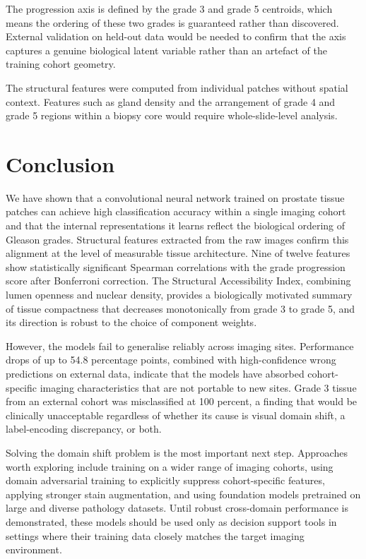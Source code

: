 \documentclass[12pt, a4paper]{article}
\begin{document}
The progression axis is defined by the grade 3 and grade 5 centroids, which means
the ordering of these two grades is guaranteed rather than discovered. External
validation on held-out data would be needed to confirm that the axis captures a
genuine biological latent variable rather than an artefact of the training cohort
geometry.

The structural features were computed from individual patches without spatial context.
Features such as gland density and the arrangement of grade 4 and grade 5 regions
within a biopsy core would require whole-slide-level analysis.

\section{Conclusion}

We have shown that a convolutional neural network trained on prostate tissue
patches can achieve high classification accuracy within a single imaging cohort
and that the internal representations it learns reflect the biological ordering
of Gleason grades. Structural features extracted from the raw images confirm this
alignment at the level of measurable tissue architecture. Nine of twelve features
show statistically significant Spearman correlations with the grade progression
score after Bonferroni correction. The Structural Accessibility Index, combining
lumen openness and nuclear density, provides a biologically motivated summary of
tissue compactness that decreases monotonically from grade 3 to grade 5, and its
direction is robust to the choice of component weights.

However, the models fail to generalise reliably across imaging sites. Performance
drops of up to 54.8 percentage points, combined with high-confidence wrong
predictions on external data, indicate that the models have absorbed cohort-specific
imaging characteristics that are not portable to new sites. Grade 3 tissue from an
external cohort was misclassified at 100 percent, a finding that would be clinically
unacceptable regardless of whether its cause is visual domain shift, a label-encoding
discrepancy, or both.

Solving the domain shift problem is the most important next step. Approaches worth
exploring include training on a wider range of imaging cohorts, using domain
adversarial training to explicitly suppress cohort-specific features, applying
stronger stain augmentation, and using foundation models pretrained on large and
diverse pathology datasets. Until robust cross-domain performance is demonstrated,
these models should be used only as decision support tools in settings where their
training data closely matches the target imaging environment.



\end{document}
